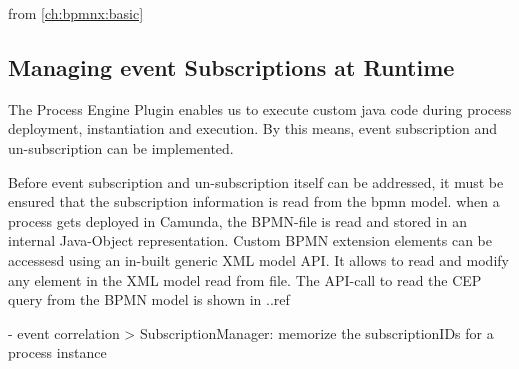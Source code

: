 


from \autoref{ch:bpmnx:basic}

\subsection{Managing event Subscriptions at Runtime}
The Process Engine Plugin enables us to execute custom java code during process deployment, instantiation and execution.
By this means, event subscription and un-subscription can be implemented.

Before event subscription and un-subscription itself can be addressed, it must be ensured that the subscription information is read from the bpmn model.
when a process gets deployed in Camunda, the BPMN-file is read and stored in an internal Java-Object representation.
Custom BPMN extension elements can be accessesd using an in-built generic XML model API.
It allows to read and modify any element in the XML model read from file. The API-call to read the CEP query from the BPMN model is shown in ..ref


- event correlation
> SubscriptionManager: memorize the subscriptionIDs for a process instance